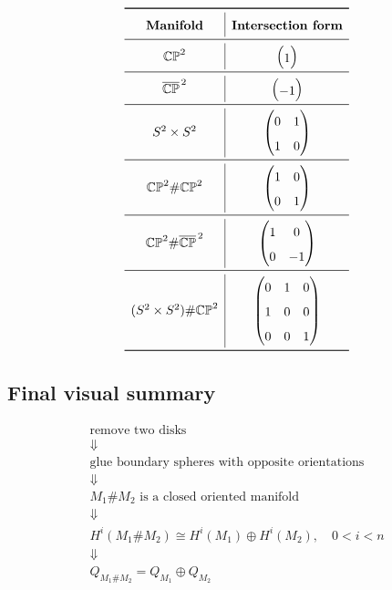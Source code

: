 \documentclass[12pt,a4paper]{article}
\theoremstyle{notespace}
\begin{document}
\[
\renewcommand{\arraystretch}{1.6}
\begin{array}{c|c}
	\toprule
	\textbf{Manifold} & \textbf{Intersection form} \\
	\midrule
	\mathbb{CP}^2
	&
	\begin{pmatrix}
		1
	\end{pmatrix}
	\\
	\midrule
	\overline{\mathbb{CP}}^{\,2}
	&
	\begin{pmatrix}
		-1
	\end{pmatrix}
	\\
	\midrule
	S^2\times S^2
	&
	\begin{pmatrix}
		0&1\\
		1&0
	\end{pmatrix}
	\\
	\midrule
	\mathbb{CP}^2\#\mathbb{CP}^2
	&
	\begin{pmatrix}
		1&0\\
		0&1
	\end{pmatrix}
	\\
	\midrule
	\mathbb{CP}^2\#\overline{\mathbb{CP}}^{\,2}
	&
	\begin{pmatrix}
		1&0\\
		0&-1
	\end{pmatrix}
	\\
	\midrule
	(S^2\times S^2)\#\mathbb{CP}^2
	&
	\begin{pmatrix}
		0&1&0\\
		1&0&0\\
		0&0&1
	\end{pmatrix}
	\\
	\bottomrule
\end{array}
\]

\subsection{Final visual summary}

\[
\boxed{
	\begin{array}{c}
		\text{remove two disks}
		\\[3pt]
		\Downarrow
		\\[3pt]
		\text{glue boundary spheres with opposite orientations}
		\\[3pt]
		\Downarrow
		\\[3pt]
		M_1\#M_2\text{ is a closed oriented manifold}
		\\[3pt]
		\Downarrow
		\\[3pt]
		H^i(M_1\#M_2)\cong H^i(M_1)\oplus H^i(M_2),\quad 0<i<n
		\\[3pt]
		\Downarrow
		\\[3pt]
		Q_{M_1\#M_2}=Q_{M_1}\oplus Q_{M_2}
	\end{array}
}
\]
	
\end{document}
